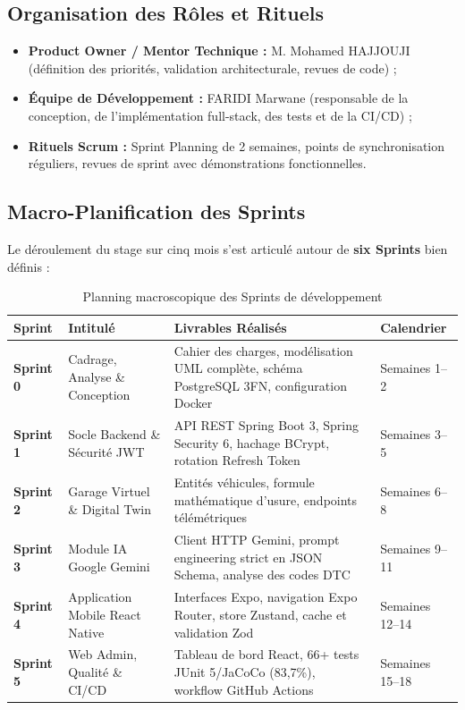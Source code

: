 \documentclass[12pt,a4paper,oneside]{report}
\newcommand{\bpuce}{\textcolor{midBlue}{$\blacktriangleright$}\;}
\begin{document}
\subsection{Organisation des R\^oles et Rituels}
\begin{itemize}[label=\bpuce]
  \item \textbf{Product Owner / Mentor Technique :} M. Mohamed HAJJOUJI (d\'efinition des priorit\'es, validation architecturale, revues de code) ;
  \item \textbf{\'Equipe de D\'eveloppement :} FARIDI Marwane (responsable de la conception, de l'impl\'ementation full-stack, des tests et de la CI/CD) ;
  \item \textbf{Rituels Scrum :} Sprint Planning de 2 semaines, points de synchronisation r\'eguliers, revues de sprint avec d\'emonstrations fonctionnelles.
\end{itemize}

\subsection{Macro-Planification des Sprints}
Le d\'eroulement du stage sur cinq mois s'est articul\'e autour de \textbf{six Sprints} bien d\'efinis :

\begin{table}[H]
\centering
\small
\begin{tabularx}{\textwidth}{p{1.8cm} p{3.8cm} X p{2.2cm}}
\toprule
\textbf{Sprint} & \textbf{Intitul\'e} & \textbf{Livrables R\'ealis\'es} & \textbf{Calendrier} \\
\midrule
\textbf{Sprint 0} & Cadrage, Analyse \& Conception & Cahier des charges, mod\'elisation UML compl\`ete, sch\'ema PostgreSQL 3FN, configuration Docker & Semaines 1--2 \\
\addlinespace
\textbf{Sprint 1} & Socle Backend \& S\'ecurit\'e JWT & API REST Spring Boot 3, Spring Security 6, hachage BCrypt, rotation Refresh Token & Semaines 3--5 \\
\addlinespace
\textbf{Sprint 2} & Garage Virtuel \& Digital Twin & Entit\'es v\'ehicules, formule math\'ematique d'usure, endpoints t\'el\'em\'etriques & Semaines 6--8 \\
\addlinespace
\textbf{Sprint 3} & Module IA Google Gemini & Client HTTP Gemini, prompt engineering strict en JSON Schema, analyse des codes DTC & Semaines 9--11 \\
\addlinespace
\textbf{Sprint 4} & Application Mobile React Native & Interfaces Expo, navigation Expo Router, store Zustand, cache et validation Zod & Semaines 12--14 \\
\addlinespace
\textbf{Sprint 5} & Web Admin, Qualit\'e \& CI/CD & Tableau de bord React, 66+ tests JUnit 5/JaCoCo (83,7\%), workflow GitHub Actions & Semaines 15--18 \\
\bottomrule
\end{tabularx}
\caption{Planning macroscopique des Sprints de d\'eveloppement}
\label{tab:sprints}
\end{table}
\end{document}
